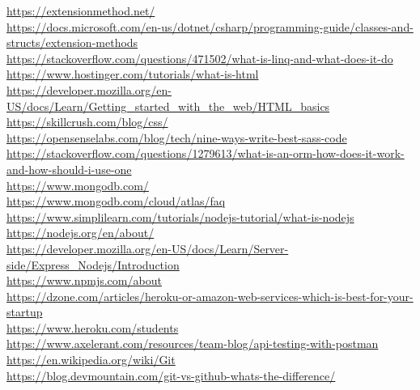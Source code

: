 \url{https://extensionmethod.net/}\\
\url{https://docs.microsoft.com/en-us/dotnet/csharp/programming-guide/classes-and-structs/extension-methods}\\
\url{https://stackoverflow.com/questions/471502/what-is-linq-and-what-does-it-do}\\
\url{https://www.hostinger.com/tutorials/what-is-html}\\
\url{https://developer.mozilla.org/en-US/docs/Learn/Getting\_started\_with\_the\_web/HTML\_basics}\\
\url{https://skillcrush.com/blog/css/}\\
\url{https://opensenselabs.com/blog/tech/nine-ways-write-best-sass-code}\\
\url{https://stackoverflow.com/questions/1279613/what-is-an-orm-how-does-it-work-and-how-should-i-use-one}\\
\url{https://www.mongodb.com/}\\
\url{https://www.mongodb.com/cloud/atlas/faq}\\
\url{https://www.simplilearn.com/tutorials/nodejs-tutorial/what-is-nodejs}\\
\url{https://nodejs.org/en/about/}\\
\url{https://developer.mozilla.org/en-US/docs/Learn/Server-side/Express\_Nodejs/Introduction}\\
\url{https://www.npmjs.com/about}\\
\url{https://dzone.com/articles/heroku-or-amazon-web-services-which-is-best-for-your-startup}\\
\url{https://www.heroku.com/students}\\
\url{https://www.axelerant.com/resources/team-blog/api-testing-with-postman}\\
\url{https://en.wikipedia.org/wiki/Git}\\
\url{https://blog.devmountain.com/git-vs-github-whats-the-difference/}\\

